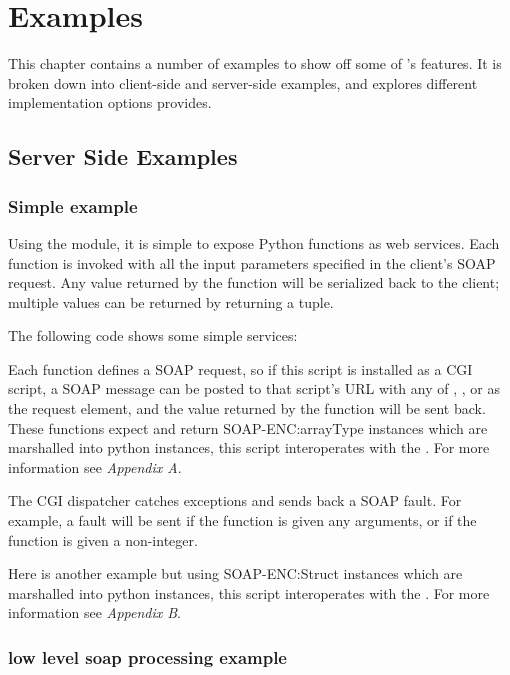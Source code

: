 \chapter{Examples}

This chapter contains a number of examples to show off some of \ZSI{}'s 
features.  It is broken down into client-side and server-side examples, and 
explores different implementation options \ZSI{} provides.

\section{Server Side Examples}
\subsection{Simple example}
Using the  module, it is simple to expose Python functions
as web services.  Each function is invoked with all the input parameters
specified in the client's SOAP request.  Any value returned by the function will
be serialized back to the client; multiple values can be returned by returning a
tuple.

The following code shows some simple services:



Each function defines a SOAP request, so if this script is installed
as a CGI script, a SOAP message can be posted to that script's URL with any of
, , or  as the request element,
and the value returned by the function will be sent back.  These functions
expect and return SOAP-ENC:arrayType instances which are marshalled into python
 instances, this script interoperates with the 
.  For more information see \emph{Appendix A}.

The \ZSI{} CGI dispatcher catches exceptions and sends back a SOAP fault.
For example, a fault will be sent if the   function is given any
arguments, or if the  function is given a non-integer.

Here is another example but using SOAP-ENC:Struct instances which are marshalled
into python  instances, this script interoperates with the
.  For more information see \emph{Appendix B}.



\subsection{low level soap processing example}

